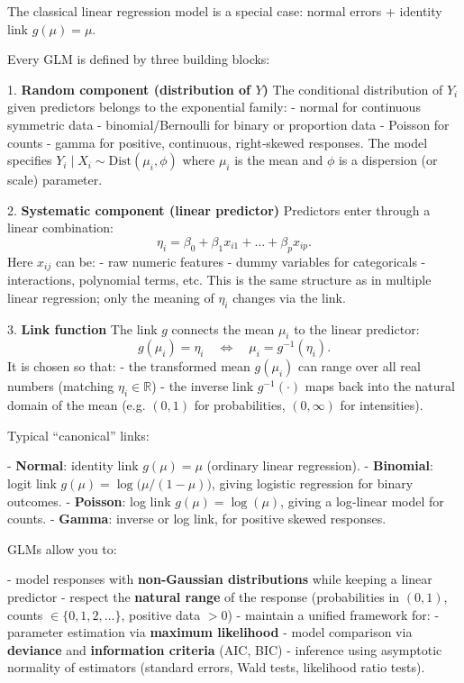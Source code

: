 The classical linear regression model is a special case: normal errors + identity link $g(\mu) = \mu$.



Every GLM is defined by three building blocks:

1. \textbf{Random component (distribution of $Y$)}  
   The conditional distribution of $Y_i$ given predictors belongs to the exponential family:
   - normal for continuous symmetric data  
   - binomial/Bernoulli for binary or proportion data  
   - Poisson for counts  
   - gamma for positive, continuous, right‑skewed responses.  
   The model specifies $Y_i \mid X_i \sim \text{Dist}(\mu_i, \phi)$ where $\mu_i$ is the mean and $\phi$ is a dispersion (or scale) parameter.

2. \textbf{Systematic component (linear predictor)}  
   Predictors enter through a linear combination:
   \[
   \eta_i = \beta_0 + \beta_1 x_{i1} + \dots + \beta_p x_{ip}.
   \]
   Here $x_{ij}$ can be:
   - raw numeric features  
   - dummy variables for categoricals  
   - interactions, polynomial terms, etc.  
   This is the same structure as in multiple linear regression; only the meaning of $\eta_i$ changes via the link.

3. \textbf{Link function}  
   The link $g$ connects the mean $\mu_i$ to the linear predictor:
   \[
   g(\mu_i) = \eta_i \quad \Longleftrightarrow \quad \mu_i = g^{-1}(\eta_i).
   \]
   It is chosen so that:
   - the transformed mean $g(\mu_i)$ can range over all real numbers (matching $\eta_i \in \mathbb{R}$)  
   - the inverse link $g^{-1}(\cdot)$ maps back into the natural domain of the mean (e.g. $(0,1)$ for probabilities, $(0,\infty)$ for intensities).  

Typical “canonical” links:

- \textbf{Normal}: identity link $g(\mu) = \mu$ (ordinary linear regression).  
- \textbf{Binomial}: logit link $g(\mu) = \log\big(\mu/(1-\mu)\big)$, giving logistic regression for binary outcomes.  
- \textbf{Poisson}: log link $g(\mu) = \log(\mu)$, giving a log‑linear model for counts.  
- \textbf{Gamma}: inverse or log link, for positive skewed responses.



GLMs allow you to:

- model responses with \textbf{non‑Gaussian distributions} while keeping a linear predictor  
- respect the \textbf{natural range} of the response (probabilities in $(0,1)$, counts $\in \{0,1,2,\dots\}$, positive data $>0$)  
- maintain a unified framework for:
  - parameter estimation via \textbf{maximum likelihood}  
  - model comparison via \textbf{deviance} and \textbf{information criteria} (AIC, BIC)  
  - inference using asymptotic normality of estimators (standard errors, Wald tests, likelihood ratio tests).



